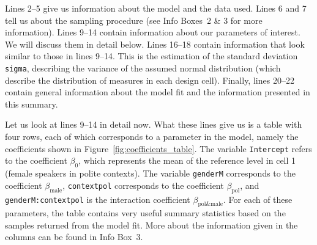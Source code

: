 \documentclass[nobib]{tufte-handout}
\begin{document}
Lines 2--5 give us information about the model and the data used. Lines 6 and 7 tell us about
the sampling procedure (see Info Boxes~2 \& 3 for more information). Lines 9--14 contain information about our
parameters of interest. We will discuss them in detail below. Lines 16--18 contain information
that look similar to those in lines 9--14. This is the estimation of the standard deviation
\texttt{sigma}, describing the variance of the assumed normal distribution (which describe the
distribution of measures in each design cell). Finally, lines 20--22 contain general
information about the model fit and the information presented in this summary.

Let us look at lines 9--14 in detail now. What these lines give us is a table with four rows, each of which corresponds to a parameter in the model, namely the coefficients shown in Figure~\ref{fig:coefficients_table}. The variable \texttt{Intercept} refers to the coefficient $\beta_0$, which represents the mean of the reference level in cell 1 (female speakers in polite contexts). The variable \texttt{genderM} corresponds to the coefficient $\beta_{\text{male}}$, \texttt{contextpol} corresponds to the coefficient $\beta_{\text{pol}}$, and \texttt{genderM:contextpol} is the interaction  coefficient $\beta_{\text{pol\&male}}$. For each of these parameters, the table contains very useful summary statistics based on the samples returned from the model fit.
%
%
More about the information given in the columns can be found in Info Box~3.
\end{document}
